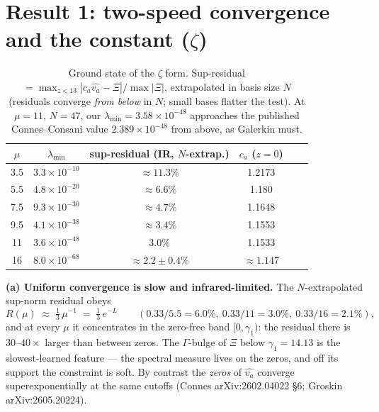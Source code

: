 \documentclass[10pt]{article}
\begin{document}
\section{Result 1: two-speed convergence and the constant ($\zeta$)}

\begin{table}[h]\centering\small
\begin{tabular}{cccccc}
\toprule
$\mu$ & $\lambda_{\min}$ & sup-residual (IR, $N$-extrap.) & $c_a$ ($z{=}0$) \\
\midrule
3.5 & $3.3\times10^{-10}$ & $\approx11.3\%$ & 1.2173 \\
5.5 & $4.8\times10^{-20}$ & $\approx6.6\%$  & 1.180 \\
7.5 & $9.3\times10^{-30}$ & $\approx4.7\%$  & 1.1648 \\
9.5 & $4.1\times10^{-38}$ & $\approx3.4\%$  & 1.1553 \\
11  & $3.6\times10^{-48}$ & $3.0\%$         & 1.1533 \\
16  & $8.0\times10^{-68}$ & $\approx2.2\pm0.4\%$ & $\approx1.147$ \\
\bottomrule
\end{tabular}
\caption{\small Ground state of the $\zeta$ form. Sup-residual
$=\max_{z<13}|c_a\widehat{v_a}-\Xi|/\max|\Xi|$, extrapolated in basis
size $N$ (residuals converge \emph{from below} in $N$; small bases
flatter the test). At $\mu=11$, $N=47$, our
$\lambda_{\min}=3.58\times10^{-48}$ approaches the published
Connes--Consani value $2.389\times10^{-48}$ from above, as Galerkin
must.}
\end{table}

\noindent\textbf{(a) Uniform convergence is slow and infrared-limited.}
The $N$-extrapolated sup-norm residual obeys
\[
R(\mu)\;\approx\;\tfrac13\,\mu^{-1}\;=\;\tfrac13\,e^{-L}
\qquad(0.33/5.5=6.0\%,\ 0.33/11=3.0\%,\ 0.33/16=2.1\%),
\]
and at every $\mu$ it concentrates in the zero-free band $[0,\gamma_1)$:
the residual there is $30$--$40\times$ larger than between zeros. The
$\Gamma$-bulge of $\Xi$ below $\gamma_1=14.13$ is the slowest-learned
feature --- the spectral measure lives on the zeros, and off its support
the constraint is soft. By contrast the \emph{zeros} of
$\widehat{v_a}$ converge superexponentially at the same cutoffs
(Connes arXiv:2602.04022 \S6; Groskin arXiv:2605.20224).
\end{document}
